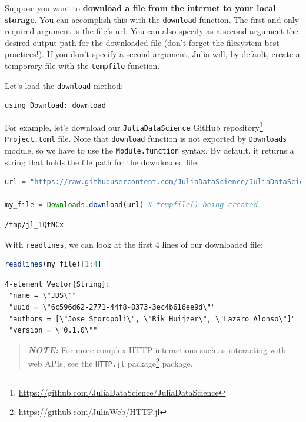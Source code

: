 \documentclass[
  notoc %
]{tufte-book}
\DeclareRobustCommand{\href}[2]{#2\footnote{\url{#1}}}
\newcommand{\passthrough}[1]{#1}
\begin{document}
Suppose you want to \textbf{download a file from the internet to your
local storage}. You can accomplish this with the
\passthrough{\lstinline!download!} function. The first and only required
argument is the file's url. You can also specify as a second argument
the desired output path for the downloaded file (don't forget the
filesystem best practices!). If you don't specify a second argument,
Julia will, by default, create a temporary file with the
\passthrough{\lstinline!tempfile!} function.

Let's load the \passthrough{\lstinline!download!} method:

\begin{lstlisting}
using Download: download
\end{lstlisting}

For example, let's download our
\href{https://github.com/JuliaDataScience/JuliaDataScience}{\passthrough{\lstinline!JuliaDataScience!}
GitHub repository} \passthrough{\lstinline!Project.toml!} file. Note
that \passthrough{\lstinline!download!} function is not exported by
\passthrough{\lstinline!Downloads!} module, so we have to use the
\passthrough{\lstinline!Module.function!} syntax. By default, it returns
a string that holds the file path for the downloaded file:

\begin{lstlisting}[language=Julia]
url = "https://raw.githubusercontent.com/JuliaDataScience/JuliaDataScience/main/Project.toml"

my_file = Downloads.download(url) # tempfile() being created
\end{lstlisting}

\begin{lstlisting}[language=Output]
/tmp/jl_1QtNCx
\end{lstlisting}

With \passthrough{\lstinline!readlines!}, we can look at the first 4
lines of our downloaded file:

\begin{lstlisting}[language=Julia]
readlines(my_file)[1:4]
\end{lstlisting}

\begin{lstlisting}[language=Output]
4-element Vector{String}:
 "name = \"JDS\""
 "uuid = \"6c596d62-2771-44f8-8373-3ec4b616ee9d\""
 "authors = [\"Jose Storopoli\", \"Rik Huijzer\", \"Lazaro Alonso\"]"
 "version = \"0.1.0\""
\end{lstlisting}

\begin{quote}
\textbf{\emph{NOTE:}} For more complex HTTP interactions such as
interacting with web APIs, see the
\href{https://github.com/JuliaWeb/HTTP.jl}{\passthrough{\lstinline!HTTP.jl!}
package} package.
\end{quote}
\end{document}
